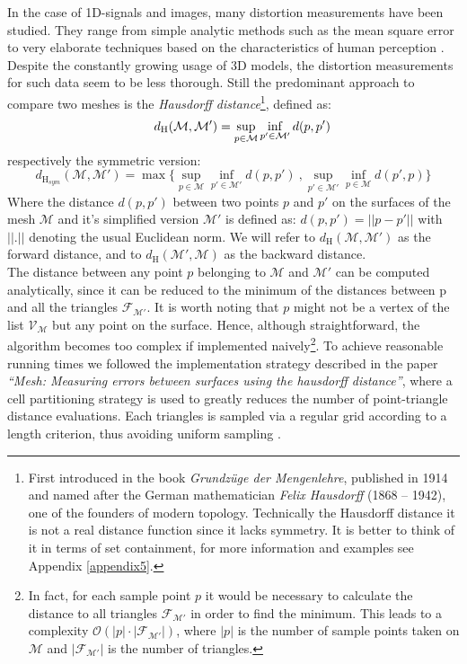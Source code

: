 In the case of 1D-signals and images, many distortion measurements have been studied.
They range from simple analytic methods such as the mean square error to very elaborate techniques based on the characteristics of human perception \citep[cf.][]{Winkler2001}.
Despite the constantly growing usage of 3D models, the distortion measurements for such data seem to be less thorough.
Still the predominant approach to compare two meshes is the \textit{Hausdorff distance}\footnote{ First introduced in the book \textit{Grundzüge der Mengenlehre}, published in 1914 and named after the German mathematician \textit{Felix Hausdorff} (1868 – 1942), one of the founders of modern topology. Technically the Hausdorff distance it is not a real distance function since it lacks symmetry. It is better to think of it in terms of set containment, for more information and examples see Appendix \ref{appendix5}.}, defined as:
\begin{equation} \label{eq:hausdorff}
\hspace*{0.5cm} d_{\mathrm H}(\mathcal{M},\mathcal{M}') = \sup_{p \in \mathcal{M}} \inf_{p' \in \mathcal{M}'} d(p, p')
\end{equation}
respectively the symmetric version:
\begin{equation}
d_{\mathrm H_{sym}}(\mathcal{M},\mathcal{M}') = \max \{\sup_{p \in \mathcal{M}} \inf_{p' \in \mathcal{M}'} d(p, p')~, \sup_{p' \in \mathcal{M}'} \inf_{p \in \mathcal{M}} d(p', p)\}
\end{equation}
Where the distance $d(p, p')$ between two points $p$ and $p'$ on the surfaces of the mesh $\mathcal{M}$ and it's simplified version $\mathcal{M}'$ is defined as: $d(p, p') = || p-p' ||$ with $||.||$ denoting the usual Euclidean norm.
We will refer to $d_{\mathrm H}(\mathcal{M},\mathcal{M}')$ as the forward distance, and to $d_{\mathrm H}(\mathcal{M}',\mathcal{M})$ as the backward distance.\\
The distance between any point $p$ belonging to $\mathcal{M}$ and $\mathcal{M}'$ can be computed analytically, since it can be reduced to the minimum of the distances between p and all the triangles $\mathcal{F}_{\mathcal{M}'}$.
It is worth noting that $p$ might not be a vertex of the list $\mathcal{V}_{\mathcal{M}}$ but any point on the surface.
Hence, although straightforward, the algorithm becomes too complex if implemented naively\footnote{ In fact, for each sample point $p$ it would be necessary to calculate the distance to all triangles $\mathcal{F}_{\mathcal{M}'}$ in order to find the minimum.
This leads to a complexity $\mathcal{O}(|p| \cdot |\mathcal{F}_{\mathcal{M}'}|)$, where $|p|$ is the number of sample points taken on $\mathcal{M}$ and $|\mathcal{F}_{\mathcal{M}'}|$ is the number of triangles.}.
To achieve reasonable running times we followed the implementation strategy described in the paper \textit{``Mesh: Measuring errors between surfaces using the hausdorff distance''}, where a cell partitioning strategy is used to greatly reduces the number of point-triangle distance evaluations.
Each triangles is sampled via a regular grid according to a length criterion, thus avoiding uniform sampling \citep[for more details see][especially chapter 3]{Aspert2002}.

